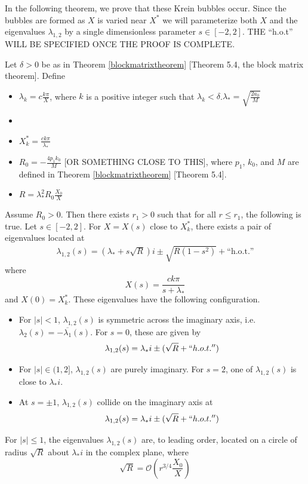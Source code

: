 \documentclass[thesis.tex]{subfiles}
\begin{document}
In the following theorem, we prove that these Krein bubbles occur. Since the bubbles are formed as $X$ is varied near $X^*$ we will parameterize both $X$ and the eigenvalues $\lambda_{1,2}$ by a single dimensionless parameter $s \in [-2, 2]$. THE ``h.o.t'' WILL BE SPECIFIED ONCE THE PROOF IS COMPLETE.

\begin{theorem}\label{theorem:kreinbubbles}
Let $\delta > 0$ be as in Theorem \ref{blockmatrixtheorem} [Theorem 5.4, the block matrix theorem]. Define
\begin{itemize}
\item $\lambda_k = c \frac{k \pi}{X}$, where $k$ is a positive integer such that $\lambda_k < \delta$.$\lambda_* = \sqrt{\frac{2 a_0}{M}}$
\item 
\item $X_k^* = \frac{c k \pi}{\lambda_*}$
\item $R_0 = -\frac{4 p_1 k_0}{M}$ [OR SOMETHING CLOSE TO THIS], where $p_1$, $k_0$, and $M$ are defined in Theorem \ref{blockmatrixtheorem} [Theorem 5.4].
\item $R = \lambda_*^2 R_0 \frac{X_0}{X}$ 
\end{itemize}
Assume $R_0 > 0$. Then there exists $r_1 > 0$ such that for all $r \leq r_1$, the following is true. Let $s \in [-2, 2]$. For $X = X(s)$ close to $X_k^*$, there exists a pair of eigenvalues located at
\begin{align*}
\lambda_{1,2}(s) = \left( \lambda_* + s \sqrt{R} \right) i \pm \sqrt{R(1 - s^2)} + \text{``h.o.t.''}
\end{align*}
where
\[
X(s) = \frac{c k \pi}{s + \lambda_*}
\]
and $X(0) = X_k^*$. These eigenvalues have the following configuration.
\begin{itemize}
\item For $|s| < 1$, $\lambda_{1,2}(s)$ is symmetric across the imaginary axis, i.e. $\lambda_2(s) = -\overline{\lambda_1}(s)$. For $s = 0$, these are given by
\[
\lambda_{1,2}(s) = \lambda_* i \pm (\sqrt{R} + ``h.o.t.'')
\]
\item For $|s| \in (1, 2]$, $\lambda_{1,2}(s)$
are purely imaginary. For $s = 2$, one of $\lambda_{1,2}(s)$ is close to $\lambda_* i$.
\item At $s = \pm 1$, $\lambda_{1,2}(s)$ collide on the imaginary axis at 
\[
\lambda_{1,2}(s) = \lambda_* i \pm (\sqrt{R} + ``h.o.t.'')
\]
\end{itemize}
For $|s| \leq 1$, the eigenvalues $\lambda_{1,2}(s)$ are, to leading order, located on a circle of radius $\sqrt{R}$ about $\lambda_* i$ in the complex plane, where
\[
\sqrt{R} = \mathcal{O}\left( r^{3/4}\frac{X_0}{X} \right)
\]
\end{theorem}
\end{document}
